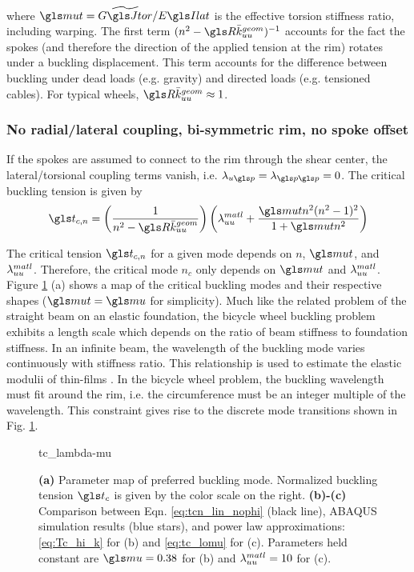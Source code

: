 \documentclass[\rootdir/thesis.tex]{subfiles}
\begin{document}
where $\mt=\widetilde{\GJ}/\EIl$ is the effective torsion stiffness ratio, including warping. The first term $(n^2 - \R\geom{\kuu})^{-1}$ accounts for the fact the spokes (and therefore the direction of the applied tension at the rim) rotates under a buckling displacement. This term accounts for the difference between buckling under dead loads (e.g. gravity) and directed loads (e.g. tensioned cables). For typical wheels, $\R\geom{\kuu} \approx 1$.

\subsubsection*{No radial/lateral coupling, bi-symmetric rim, no spoke offset}
If the spokes are assumed to connect to the rim through the shear center, the lateral/torsional coupling terms vanish, i.e. $\lr_{u\p}=\lr_{\p\p}=0$. The critical buckling tension is given by \cite{Ford2016}
\begin{equation}
\label{eq:tcn_lin_nophi}
\ts_{c,n} = \left(\frac{1}{n^2 - \R\geom{\kuu}}\right)
\left(\matl{\lr_{uu}}
      +\frac{\mt n^2(n^2-1)^2}
        {1 + \mt n^2}\right)
\end{equation}

The critical tension $\ts_{c,n}$ for a given mode depends on $n$, $\mt$, and $\lambda_{uu}^{matl}$. Therefore, the critical mode $n_c$ only depends on $\mt$ and $\lambda_{uu}^{matl}$. Figure \ref{fig:tc_lambda_mu} (a) shows a map of the critical buckling modes and their respective shapes ($\mt=\m$ for simplicity). Much like the related problem of the straight beam on an elastic foundation, the bicycle wheel buckling problem exhibits a length scale which depends on the ratio of beam stiffness to foundation stiffness. In an infinite beam, the wavelength of the buckling mode varies continuously with stiffness ratio. This relationship is used to estimate the elastic modulii of thin-films \cite{Chung2011}. In the bicycle wheel problem, the buckling wavelength must fit around the rim, i.e. the circumference must be an integer multiple of the wavelength. This constraint gives rise to the discrete mode transitions shown in Fig. \ref{fig:tc_lambda_mu}.

\begin{figure}
\centering
{tc_lambda-mu}
\caption{\textbf{(a)} Parameter map of preferred buckling mode. Normalized buckling tension $\ts_c$ is given by the color scale on the right. \textbf{(b)-(c)} Comparison between Eqn. \eqref{eq:tcn_lin_nophi} (black line), ABAQUS simulation results (blue stars), and power law approximations: \eqref{eq:Tc_hi_k} for (b) and \eqref{eq:tc_lomu} for (c). Parameters held constant are $\m=0.38$ for (b) and $\lambda_{uu}^{matl}=10$ for (c).}
\label{fig:tc_lambda_mu}
\end{figure}
\end{document}
